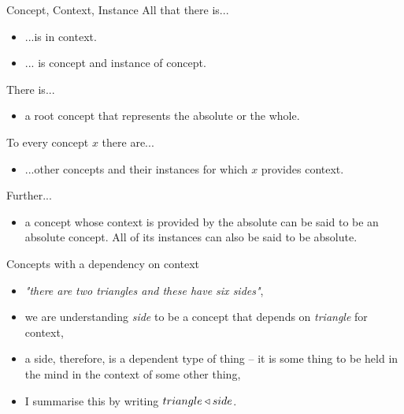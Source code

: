 

\begin{frame}{Concept, Context, Instance}
All that there is...
\begin{itemize}
\item ...is in context.
\item ... is concept and instance of concept.
\end{itemize}
There is...
\begin{itemize}
\item a root concept that represents the absolute or the whole.
\end{itemize}
To every concept $x$ there are...
\begin{itemize}
\item ...other concepts and their instances for which $x$ provides context.
\end{itemize}
Further...
\begin{itemize}
\item a concept whose context is provided by the absolute can be said to be an absolute concept.  
All of its instances can also be said to be absolute.
\end{itemize}
\end{frame}

\begin{frame}{Concepts with a dependency on context}
\begin{center}
\raisebox{-0.5cm}{
\pspicture(0,-0.1)(1.1,1)
\psline(0,0)(0,1)(1,1)(1,0)(0,0)
\psline (0,0)(1,1)
\endpspicture
}
\end{center}
\begin{itemize}
\item \textit{"there are two triangles and these have six sides"}, 
\item  we are understanding \textit{side} to be a concept that 
depends on \textit{triangle} for context,
\item a side, therefore, is a dependent type of thing -- it is some thing to be held in the mind
in the context of some other thing,
\item I summarise this by writing $triangle \triangleleft side$.
\end{itemize}
\end{frame}

